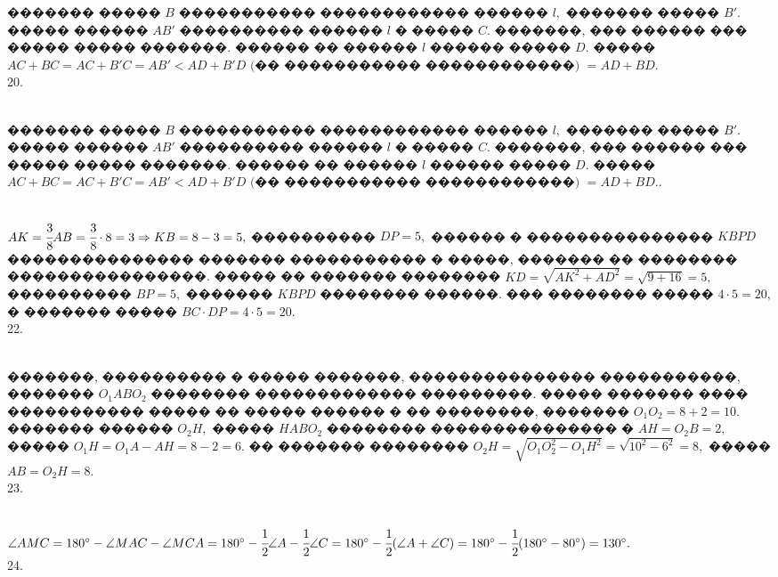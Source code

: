 \documentclass[12pt]{article}
\begin{document}
������� ����� $B$ ����������� ������������ ������ $l,$ ������� ����� $B'.$ ����� ������ $AB'$ ���������� ������ $l$ � ����� $C.$ �������, ��� ������ ��� ����� ����� �������. ������ �� ������ $l$ ������ ����� $D.$ ����� $AC+BC=AC+B'C=AB'<AD+B'D\text{ (�� ����������� ������������) }=AD+BD.$\\
20. \begin{figure}[ht!]
\end{figure}\\
������� ����� $B$ ����������� ������������ ������ $l,$ ������� ����� $B'.$ ����� ������ $AB'$ ���������� ������ $l$ � ����� $C.$ �������, ��� ������ ��� ����� ����� �������. ������ �� ������ $l$ ������ ����� $D.$ ����� $AC+BC=AC+B'C=AB'<AD+B'D\text{ (�� ����������� ������������) }=AD+BD.$\newpage{}. \begin{figure}[ht!]
\end{figure}\\
$AK=\cfrac{3}{8}AB=\cfrac{3}{8}\cdot8=3\Rightarrow KB=8-3=5,$ ���������� $DP=5,$ ������ � ��������������� $KBPD$ ��������������� ������� ����������� � �����, ������� �� �������� ����������������. ����� �� ������� �������� $KD=\sqrt{AK^2+AD^2}=\sqrt{9+16}=5,$ ���������� $BP=5,$ ������� $KBPD$ �������� ������. ��� �������� ����� $4\cdot5=20,$ � ������� ����� $BC\cdot DP=4\cdot5=20.$\\
22. \begin{figure}[ht!]
\end{figure}\\
�������, ���������� � ����� �������, ��������������� �����������, ������� $O_1ABO_2$ �������� ������������� ���������. ����� ������� ���� ����������� ����� �� ����� ������ � �� ��������, ������� $O_1O_2=8+2=10.$ ������� ������ $O_2H,$ ����� $HABO_2$ �������� ��������������� � $AH=O_2B=2,$ ����� $O_1H=O_1A-AH=8-2=6.$ �� ������� �������� $O_2H=\sqrt{O_1O_2^2-O_1H^2}=\sqrt{10^2-6^2}=8,$ ����� $AB=O_2H=8.$\\
23. \begin{figure}[ht!]
\end{figure}\\
$\angle AMC=180^\circ-\angle MAC-\angle MCA=180^\circ-\cfrac{1}{2}\angle A-\cfrac{1}{2}\angle C=180^\circ-\cfrac{1}{2}(\angle A+\angle C)=
180^\circ-\cfrac{1}{2}(180^\circ-80^\circ)=130^\circ.$\\
24. \begin{figure}[ht!]
\end{figure}\\
\end{document}
